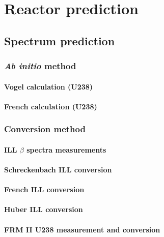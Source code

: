 \documentclass[../thesis.tex]{subfiles}
\begin{document}
\chapter{Reactor prediction}
\label{chap:bkg}

\section{Spectrum prediction}
\label{sec:specpred}

\subsection{\textit{Ab initio} method}
\label{sec:abinitio}

\subsubsection{Vogel calculation (U238)}
\label{sec:vogel}

\subsubsection{French calculation (U238)}
\label{sec:french238}

\subsection{Conversion method}
\label{sec:conversion}

\subsubsection{ILL $\beta$ spectra measurements}
\label{sec:illmeas}

\subsubsection{Schreckenbach ILL conversion}
\label{sec:schreck}

\subsubsection{French ILL conversion}
\label{sec:frenchconv}

\subsubsection{Huber ILL conversion}
\label{sec:huberconv}

\subsubsection{FRM II U238 measurement and conversion}
\label{sec:u238conv}
\end{document}
